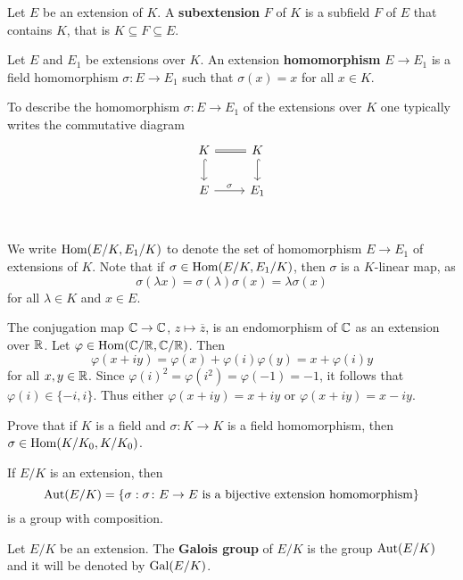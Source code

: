 \begin{definition}
	Let $E$ be an extension of $K$. A \textbf{subextension} $F$ 
	of $K$ is a subfield $F$ of $E$ that contains $K$, that is
	$K\subseteq F\subseteq E$. 
\end{definition}

\begin{definition}
	Let $E$ and $E_1$ be extensions over $K$. An extension
	\textbf{homomorphism} $E\to E_1$ is a 
	field homomorphism $\sigma\colon E\to E_1$ such that 
	$\sigma(x)=x$ for all $x\in K$. 
\end{definition}

To describe the homomorphism $\sigma\colon E\to E_1$ of the extensions over $K$
one typically writes the commutative diagram 
\[
	\begin{tikzcd}
	K & K \\
	E & {E_1} \\
	& {}
	\arrow["\sigma", from=2-1, to=2-2]
	\arrow[equal, no head, from=1-1, to=1-2]
	\arrow[hook, from=1-1, to=2-1]
	\arrow[hook, from=1-2, to=2-2]
\end{tikzcd}
\]
We write $\operatorname{Hom}(E/K,E_1/K)$ to denote
the set of homomorphism $E\to E_1$ of extensions of $K$. Note
that if $\sigma\in\operatorname{Hom}(E/K,E_1/K)$, then
$\sigma$ is a $K$-linear map, as
\[
	\sigma(\lambda x)=\sigma(\lambda)\sigma(x)=\lambda\sigma(x)
\]
for all $\lambda\in K$ and $x\in E$. 

\begin{example}
	The conjugation map $\mathbb{C}\to\mathbb{C}$, $z\mapsto\overline{z}$, 
	is an endomorphism of $\mathbb{C}$ as an extension over $\mathbb{R}$. Let 
	$\varphi\in\operatorname{Hom}(\mathbb{C}/\mathbb{R},\mathbb{C}/\mathbb{R})$. Then 
	\[
	\varphi(x+iy)=\varphi(x)+\varphi(i)\varphi(y)=x+\varphi(i)y
	\]
	for all $x,y\in\mathbb{R}$. Since $\varphi(i)^2=\varphi(i^2)=\varphi(-1)=-1$, 
	it follows that $\varphi(i)\in\{-i,i\}$. Thus either 
	$\varphi(x+iy)=x+iy$ or $\varphi(x+iy)=x-iy$. 
\end{example}

\begin{exercise}
	Prove that if $K$ is a field and $\sigma\colon K\to K$ is a field homomorphism, 
then $\sigma\in\operatorname{Hom}(K/K_0,K/K_0)$. 
\end{exercise}

If $E/K$ is an extension, then
\[
	\operatorname{Aut}(E/K)=\{\sigma:\sigma\colon E\to E\text{ is a bijective extension homomorphism}\}
\]
is a group with composition.

\begin{definition}
	Let $E/K$ be an extension. The \textbf{Galois group}
	of $E/K$ is the group
	$\operatorname{Aut}(E/K)$ and it will be denoted by $\operatorname{Gal}(E/K)$. 
\end{definition}

